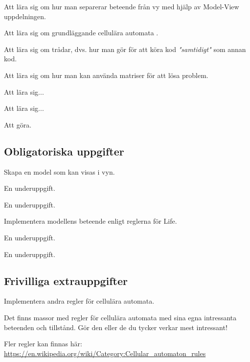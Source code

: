 

\Lab{\LabWeekTWELVE}

\begin{Goals}
\item Att lära sig om hur man separerar beteende från vy med hjälp av Model-View uppdelningen.
\item Att lära sig om grundläggande cellulära automata .
\item Att lära sig om trådar, dvs. hur man gör för att köra kod \emph{"samtidigt"} som annan kod.
\item Att lära sig om hur man kan använda matriser för att lösa problem.
\item Att lära sig...
\item Att lära sig...
\end{Goals}

\begin{Preparations}
\item Att göra.
\end{Preparations}

\subsection{Obligatoriska uppgifter}

\Task Skapa en model som kan visas i vyn.

\Subtask En underuppgift.

\Subtask En underuppgift.


\Task Implementera modellens beteende enligt reglerna för Life.

\Subtask En underuppgift.

\Subtask En underuppgift.


\subsection{Frivilliga extrauppgifter}

\Task Implementera andra regler för cellulära automata.

    Det finns massor med regler för cellulära automata med sina egna intressanta beteenden och tillstånd.
    Gör den eller de du tycker verkar mest intressant!

    Fler regler kan finnas här: \url{https://en.wikipedia.org/wiki/Category:Cellular_automaton_rules}

